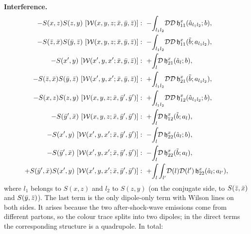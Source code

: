 \documentclass[9pt]{article}
\numberwithin{equation}{section}
\begin{document}
\noindent\textbf{Interference.}
\begin{align}
    -S(x,z)S(z,y)\ [\mathcal{W}(x,y,z;\Bar{x},\Bar{y},\Bar{z})] & :\ -\!\int_{l_{1}l_{2}}\!\mathcal{D}\mathcal{D}\,\mathfrak{h}^{x}_{11}(\hat{a}_{l_{1}l_{2}};b), \notag \\
    -S(\Bar{z},\Bar{x})S(\Bar{y},\Bar{z})\ [\mathcal{W}(x,y,z;\Bar{x},\Bar{y},\Bar{z})] & :\ -\!\int_{l_{1}l_{2}}\!\mathcal{D}\mathcal{D}\,\mathfrak{h}^{x}_{11}(\Tilde{b};a_{l_{1}l_{2}}),\notag \\
    -S(x',y)\ [\mathcal{W}(x',y,x';\Bar{x},\Bar{y},\Bar{z})] & :\ +\!\int_{l}\!\mathcal{D}\,\mathfrak{h}^{x}_{21}(\hat{a}_{l};b), \notag \\
    -S(\Bar{z},\Bar{x})S(\Bar{y},\Bar{z})\ [\mathcal{W}(x',y,x';\Bar{x},\Bar{y},\Bar{z})] & :\ +\!\int_{l_{1}l_{2}}\!\mathcal{D}\mathcal{D}\,\mathfrak{h}^{x}_{21}(\Tilde{b};a_{l_{1}l_{2}}),\notag \\
    -S(x,z)S(z,y)\ [\mathcal{W}(x,y,z;\Bar{x},\Bar{y}',\Bar{y}')] & :\ +\!\int_{l_{1}l_{2}}\!\mathcal{D}\mathcal{D}\,\mathfrak{h}^{x}_{12}(\hat{a}_{l_{1}l_{2}};b), \notag \\
    -S(\Bar{y}',\Bar{x})\ [\mathcal{W}(x,y,z;\Bar{x},\Bar{y}',\Bar{y}')] & :\ +\!\int_{l}\!\mathcal{D}\,\mathfrak{h}^{x}_{12}(\Tilde{b};a_{l}),\notag \\
    -S(x',y)\ [\mathcal{W}(x',y,x';\Bar{x},\Bar{y}',\Bar{y}')] & :\ -\!\int_{l}\!\mathcal{D}\,\mathfrak{h}^{x}_{22}(\hat{a}_{l};b), \notag \\
    -S(\Bar{y}',\Bar{x})\ [\mathcal{W}(x',y,x';\Bar{x},\Bar{y}',\Bar{y}')] & :\ -\!\int_{l}\!\mathcal{D}\,\mathfrak{h}^{x}_{22}(\Tilde{b};a_{l}),\notag \\
    +S(\Bar{y}',\Bar{x})S(x',y)\ [\mathcal{W}(x',y,x';\Bar{x},\Bar{y}',\Bar{y}')] & :\ +\!\int_{l}\int_{l'}\!\mathcal{D}(l)\mathcal{D}(l')\,\mathfrak{h}^{x}_{22}(\hat{a}_{l};a_{l'}),
\end{align}
where $l_{1}$ belongs to $S(x,z)$ and $l_{2}$ to $S(z,y)$ (on the conjugate side, to $S(\Bar{z},\Bar{x})$ and $S(\Bar{y},\Bar{z})$). The last term is the only dipole-only term with Wilson lines on both sides. It arises because the two after-shock-wave emissions come from different partons, so the colour trace splits into two dipoles; in the direct terms the corresponding structure is a quadrupole. In total:
\end{document}
